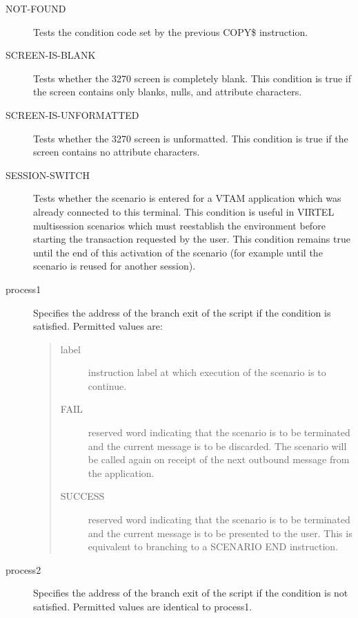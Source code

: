 \documentclass[letterpaper,10pt,english]{sphinxmanual}
\begin{document}
\begin{description}
\item[{NOT-FOUND}] \leavevmode
Tests the condition code set by the previous COPY\$ instruction.

\item[{SCREEN-IS-BLANK}] \leavevmode
Tests whether the 3270 screen is completely blank. This condition is true if the screen contains only blanks, nulls, and attribute characters.

\item[{SCREEN-IS-UNFORMATTED}] \leavevmode
Tests whether the 3270 screen is unformatted. This condition is true if the screen contains no attribute characters.

\item[{SESSION-SWITCH}] \leavevmode
Tests whether the scenario is entered for a VTAM application which was already connected to this terminal. This condition is useful in VIRTEL multisession scenarios which must reestablish the environment before starting the transaction requested by the user. This condition remains true until the end of this activation of the scenario (for example until the scenario is reused for another session).

\item[{process1}] \leavevmode
Specifies the address of the branch exit of the script if the condition is satisfied. Permitted values are:
\begin{quote}
\begin{description}
\item[{label}] \leavevmode
instruction label at which execution of the scenario is to continue.

\item[{FAIL}] \leavevmode
reserved word indicating that the scenario is to be terminated and the current message is to be discarded. The scenario will be called again on receipt of the next outbound message from the application.

\item[{SUCCESS}] \leavevmode
reserved word indicating that the scenario is to be terminated and the current message is to be presented to the user. This is equivalent to branching to a SCENARIO END instruction.

\end{description}
\end{quote}

\item[{process2}] \leavevmode
Specifies the address of the branch exit of the script if the condition is not satisfied. Permitted values are identical to process1.

\end{description}
\end{document}
